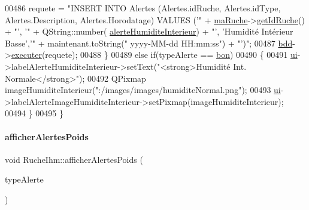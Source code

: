 \begin{DoxyCode}
00486         requete = \textcolor{stringliteral}{"INSERT INTO Alertes (Alertes.idRuche, Alertes.idType, Alertes.Description,
       Alertes.Horodatage) VALUES ('"} + \hyperlink{class_ruche_ihm_a43a6b1fa31f4fba58d919daae3707b38}{maRuche}->\hyperlink{class_ruche_a9f2de5ef29557ec7a53d5e22df34d164}{getIdRuche}() + \textcolor{stringliteral}{"', '"} + QString::number(
      \hyperlink{parametres_8h_a83a725fd153179a2bd97afcc8307737bac0e80b2d9b7f04033abc44ebcf61883a}{alerteHumiditeInterieur}) + \textcolor{stringliteral}{"', 'Humidité Intérieur Basse','"} + maintenant.toString(\textcolor{stringliteral}{"
      yyyy-MM-dd  HH:mm:ss"}) + \textcolor{stringliteral}{"')"};
00487         \hyperlink{class_ruche_ihm_a0851936fe212e8d40538264f09749153}{bdd}->\hyperlink{class_base_de_donnees_aa8de5f8f8bb17edc43f5c0ee33712081}{executer}(requete);
00488      \}
00489      \textcolor{keywordflow}{else} \textcolor{keywordflow}{if}(typeAlerte == \hyperlink{parametres_8h_aaa6de8207c94675264c90b10b613368da5ac8ec3b54d90a07c6bb5a77ef971821}{bon})
00490      \{
00491         \hyperlink{class_ruche_ihm_a64786058bd7f88ca2f1e9743bb27c25b}{ui}->labelAlerteHumiditeInterieur->setText(\textcolor{stringliteral}{"<strong>Humidité Int. Normale</strong>"});
00492         QPixmap imageHumiditeInterieur(\textcolor{stringliteral}{":/images/images/humiditeNormal.png"});
00493         \hyperlink{class_ruche_ihm_a64786058bd7f88ca2f1e9743bb27c25b}{ui}->labelAlerteImageHumiditeInterieur->setPixmap(imageHumiditeInterieur);
00494      \}
00495 \}
\end{DoxyCode}
\mbox{\label{class_ruche_ihm_a641d05346e527c3386ed9df6a7e6fafc}} 
\paragraph{\texorpdfstring{afficher\+Alertes\+Poids}{afficherAlertesPoids}}
{\footnotesize\ttfamily void Ruche\+Ihm\+::afficher\+Alertes\+Poids (\begin{DoxyParamCaption}\item[{\hyperlink{parametres_8h_aaa6de8207c94675264c90b10b613368d}{Seuils\+Alertes}}]{type\+Alerte }\end{DoxyParamCaption})\hspace{0.3cm}{\ttfamily [slot]}}



